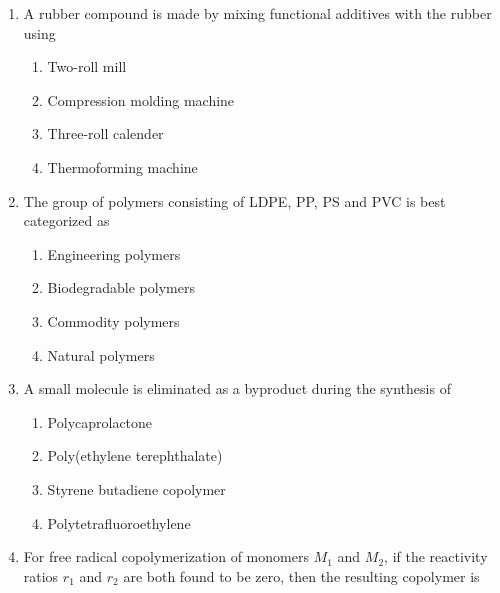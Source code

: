 \documentclass[a4paper,10pt]{article}
\begin{document}
\begin{enumerate}
\item A rubber compound is made by mixing functional additives with the rubber using
\begin{flushright}
\end{flushright}

\begin{multicols}{2}
\begin{enumerate}
\item Two-roll mill
\item Compression molding machine
\item Three-roll calender
\item Thermoforming machine
\end{enumerate}
\end{multicols}

\item The group of polymers consisting of LDPE, PP, PS and PVC is best categorized as
\begin{flushright}
\end{flushright}

\begin{multicols}{2}
\begin{enumerate}
\item Engineering polymers
\item Biodegradable polymers
\item Commodity polymers
\item Natural polymers
\end{enumerate}
\end{multicols}

\item A small molecule is eliminated as a byproduct during the synthesis of
\hfill{}

\begin{multicols}{2}
\begin{enumerate}
\item Polycaprolactone
\item Poly(ethylene terephthalate)
\item Styrene butadiene copolymer
\item Polytetrafluoroethylene
\end{enumerate}
\end{multicols}

\item For free radical copolymerization of monomers $M_1$ and $M_2$, if the reactivity ratios $r_1$ and $r_2$ are both found to be zero, then the resulting copolymer is
\hfill{}


\end{enumerate}
\end{document}
